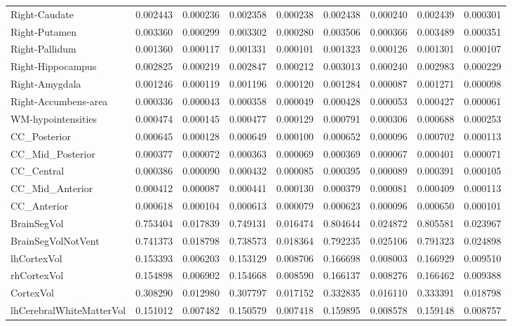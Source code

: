 \begin{table}[H]
\begin{tabular}{lcccccccc}
Right-Caudate & 0.002443 & 0.000236 & 0.002358 & 0.000238 & 0.002438 & 0.000240 & 0.002439 & 0.000301 \\
Right-Putamen & 0.003360 & 0.000299 & 0.003302 & 0.000280 & 0.003506 & 0.000366 & 0.003489 & 0.000351 \\
Right-Pallidum & 0.001360 & 0.000117 & 0.001331 & 0.000101 & 0.001323 & 0.000126 & 0.001301 & 0.000107 \\
Right-Hippocampus & 0.002825 & 0.000219 & 0.002847 & 0.000212 & 0.003013 & 0.000240 & 0.002983 & 0.000229 \\
Right-Amygdala & 0.001246 & 0.000119 & 0.001196 & 0.000120 & 0.001284 & 0.000087 & 0.001271 & 0.000098 \\
Right-Accumbens-area & 0.000336 & 0.000043 & 0.000358 & 0.000049 & 0.000428 & 0.000053 & 0.000427 & 0.000061 \\
WM-hypointensities & 0.000474 & 0.000145 & 0.000477 & 0.000129 & 0.000791 & 0.000306 & 0.000688 & 0.000253 \\
CC_Posterior & 0.000645 & 0.000128 & 0.000649 & 0.000100 & 0.000652 & 0.000096 & 0.000702 & 0.000113 \\
CC_Mid_Posterior & 0.000377 & 0.000072 & 0.000363 & 0.000069 & 0.000369 & 0.000067 & 0.000401 & 0.000071 \\
CC_Central & 0.000386 & 0.000090 & 0.000432 & 0.000085 & 0.000395 & 0.000089 & 0.000391 & 0.000105 \\
CC_Mid_Anterior & 0.000412 & 0.000087 & 0.000441 & 0.000130 & 0.000379 & 0.000081 & 0.000409 & 0.000113 \\
CC_Anterior & 0.000618 & 0.000104 & 0.000613 & 0.000079 & 0.000623 & 0.000096 & 0.000650 & 0.000101 \\
BrainSegVol & 0.753404 & 0.017839 & 0.749131 & 0.016474 & 0.804644 & 0.024872 & 0.805581 & 0.023967 \\
BrainSegVolNotVent & 0.741373 & 0.018798 & 0.738573 & 0.018364 & 0.792235 & 0.025106 & 0.791323 & 0.024898 \\
lhCortexVol & 0.153393 & 0.006203 & 0.153129 & 0.008706 & 0.166698 & 0.008003 & 0.166929 & 0.009510 \\
rhCortexVol & 0.154898 & 0.006902 & 0.154668 & 0.008590 & 0.166137 & 0.008276 & 0.166462 & 0.009388 \\
CortexVol & 0.308290 & 0.012980 & 0.307797 & 0.017152 & 0.332835 & 0.016110 & 0.333391 & 0.018798 \\
lhCerebralWhiteMatterVol & 0.151012 & 0.007482 & 0.150579 & 0.007418 & 0.159895 & 0.008578 & 0.159148 & 0.008757 \\

\end{tabular}
\end{table}
